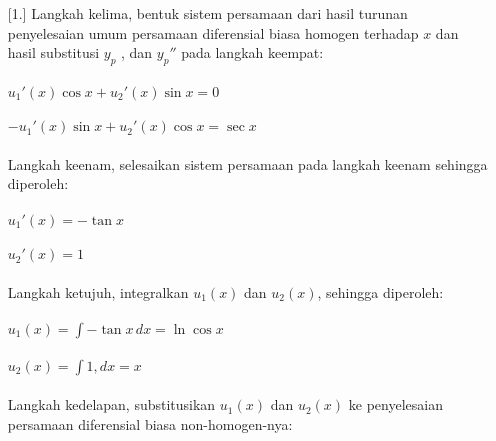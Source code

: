 \begin{enumerate} [1.]
	Langkah kelima, bentuk sistem persamaan dari hasil turunan penyelesaian umum persamaan diferensial biasa homogen terhadap \begin{math} x \end{math} dan hasil substitusi \begin{math} y_p \end{math} , dan \begin{math} y_p '' \end{math} pada langkah keempat: \\ \\
	\begin{math} u_1 '(x) \cos x + u_2 ' (x) \sin x = 0 \end{math} \\ \\
	\begin{math} -u_1 '(x) \sin x + u_2 ' (x) \cos x = \sec x \end{math} \\ \\
	Langkah keenam, selesaikan sistem persamaan pada langkah keenam sehingga diperoleh: \\ \\
	\begin{math} u_1 ' (x) = - \tan x \end{math} \\ \\
	\begin{math} u_2 ' (x) = 1 \end{math} \\ \\
	Langkah ketujuh, integralkan \begin{math} u_1 (x) \end{math} dan \begin{math} u_2 (x) \end{math}, sehingga diperoleh: \\ \\
	\begin{math} u_1 (x) = \int - \tan x \, dx = \ln \cos x \end{math} \\ \\
	\begin{math} u_2 (x) = \int 1, dx = x \end{math} \\ \\
	Langkah kedelapan, substitusikan \begin{math} u_1 (x) \end{math} dan \begin{math} u_2 (x) \end{math} ke penyelesaian persamaan diferensial biasa non-homogen-nya: \\ \\

\end{enumerate}

